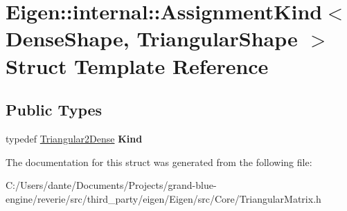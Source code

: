 \hypertarget{struct_eigen_1_1internal_1_1_assignment_kind_3_01_dense_shape_00_01_triangular_shape_01_4}{}\section{Eigen\+::internal\+::Assignment\+Kind$<$ Dense\+Shape, Triangular\+Shape $>$ Struct Template Reference}
\label{struct_eigen_1_1internal_1_1_assignment_kind_3_01_dense_shape_00_01_triangular_shape_01_4}
\subsection*{Public Types}
\begin{DoxyCompactItemize}
\item 
\mbox{\label{struct_eigen_1_1internal_1_1_assignment_kind_3_01_dense_shape_00_01_triangular_shape_01_4_ac48974e888776fdee480c930aade0a63}} 
typedef \mbox{\hyperlink{struct_eigen_1_1internal_1_1_triangular2_dense}{Triangular2\+Dense}} {\bfseries Kind}
\end{DoxyCompactItemize}


The documentation for this struct was generated from the following file\+:\begin{DoxyCompactItemize}
\item 
C\+:/\+Users/dante/\+Documents/\+Projects/grand-\/blue-\/engine/reverie/src/third\+\_\+party/eigen/\+Eigen/src/\+Core/Triangular\+Matrix.\+h\end{DoxyCompactItemize}
